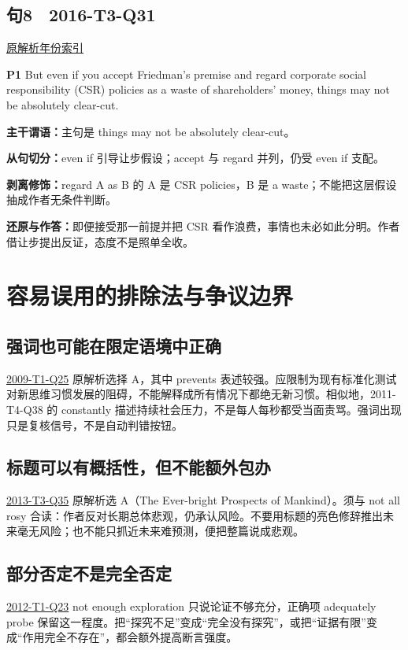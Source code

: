 \documentclass[11pt,a4paper]{article}
\begin{document}
\subsection{句8　2016-T3-Q31}
\noindent \href{https://zj139.github.io/math-notes/english/b6f08ab4d489c8194307c00d/\#q31}{原解析}\quad \hyperref[idx-2016-T3-Q31]{年份索引}
\begin{evidence}\textbf{P1} But even if you accept Friedman's premise and regard corporate social responsibility (CSR) policies as a waste of shareholders’ money, things may not be absolutely clear-cut.\end{evidence}
\noindent\textbf{主干谓语：}主句是 things may not be absolutely clear-cut。\par
\noindent\textbf{从句切分：}even if 引导让步假设；accept 与 regard 并列，仍受 even if 支配。\par
\noindent\textbf{剥离修饰：}regard A as B 的 A 是 CSR policies，B 是 a waste；不能把这层假设抽成作者无条件判断。\par
\noindent\textbf{还原与作答：}即便接受那一前提并把 CSR 看作浪费，事情也未必如此分明。作者借让步提出反证，态度不是照单全收。\par
\clearpage\section{容易误用的排除法与争议边界}\label{boundaries}
\subsection{强词也可能在限定语境中正确}
\noindent \hyperref[idx-2009-T1-Q25]{2009-T1-Q25}
原解析选择 A，其中 prevents 表述较强。应限制为现有标准化测试对新思维习惯发展的阻碍，不能解释成所有情况下都绝无新习惯。相似地，2011-T4-Q38 的 constantly 描述持续社会压力，不是每人每秒都受当面责骂。强词出现只是复核信号，不是自动判错按钮。\par
{}
\subsection{标题可以有概括性，但不能额外包办}
\noindent \hyperref[idx-2013-T3-Q35]{2013-T3-Q35}
原解析选 A（The Ever-bright Prospects of Mankind）。须与 not all rosy 合读：作者反对长期总体悲观，仍承认风险。不要用标题的亮色修辞推出未来毫无风险；也不能只抓近未来难预测，便把整篇说成悲观。\par
{}
\subsection{部分否定不是完全否定}
\noindent \hyperref[idx-2012-T1-Q23]{2012-T1-Q23}
not enough exploration 只说论证不够充分，正确项 adequately probe 保留这一程度。把“探究不足”变成“完全没有探究”，或把“证据有限”变成“作用完全不存在”，都会额外提高断言强度。\par
{}
\end{document}
